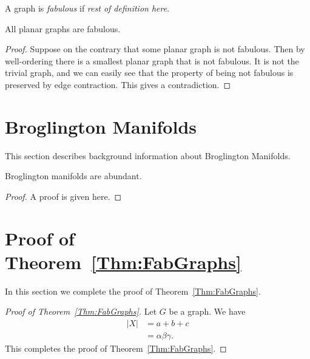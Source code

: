 \documentclass[12pt]{article}
\begin{document}
\begin{definition} 
  A graph is \emph{fabulous} if \emph{rest of definition here}.
\end{definition}

\begin{theorem}\label{Thm:FabGraphs}
  All planar graphs are fabulous.
\end{theorem}

\begin{proof}
  Suppose on the contrary that some planar graph is not fabulous.
  Then by well-ordering there is a smallest planar graph that is
  not fabulous.  It is not the trivial graph, and we can easily see 
  that the property of being not fabulous is preserved by edge contraction.
  This gives a contradiction.
\end{proof}

\section{Broglington Manifolds}

This section describes background information about Broglington
Manifolds.

\begin{lemma}\label{lem:Technical}
  Broglington manifolds are abundant.
\end{lemma}

\begin{proof}
  A proof is given here.
\end{proof}

\section{Proof of Theorem~\ref{Thm:FabGraphs}}

In this section we complete the proof of Theorem~\ref{Thm:FabGraphs}.

\begin{proof}[Proof of Theorem~\ref{Thm:FabGraphs}]
Let $G$ be a graph. We have
  \begin{align}
    |X| &= a+b+c \nonumber\\
         &= \alpha\beta\gamma.
  \end{align}
  This completes the proof of Theorem~\ref{Thm:FabGraphs}.
\end{proof}
\end{document}
